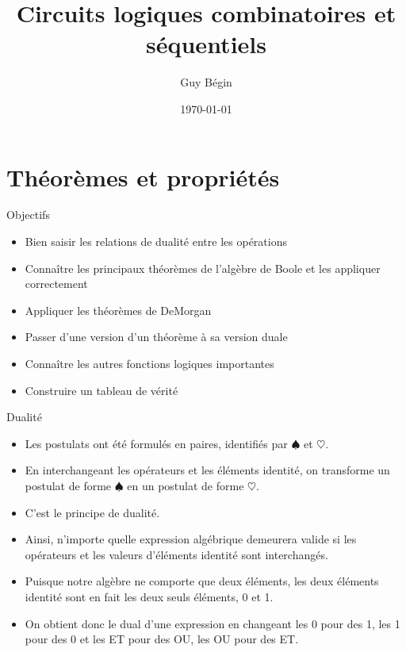 \documentclass[presentation]{beamer}
\author{Guy Bégin}
\date{\today}
\title{Circuits logiques combinatoires et séquentiels}
\begin{document}
\maketitle


\section{Théorèmes et propriétés}
\label{sec:orgb6a0084}
\begin{frame}[label={sec:org0343b0f}]{Objectifs}
\begin{itemize}
\item Bien saisir les relations de dualité entre les opérations
\item Connaître les principaux théorèmes de l'algèbre de Boole et 
les appliquer correctement
\item Appliquer les théorèmes de DeMorgan
\item Passer d'une version d'un théorème à sa version duale
\item Connaître les autres fonctions logiques importantes
\item Construire un tableau de vérité
\end{itemize}
\end{frame}

\begin{frame}[label={sec:orgc19c5fb}]{Dualité}
\begin{itemize}
\item Les postulats ont été formulés en paires, identifiés par \(\spadesuit\) et \(\heartsuit\).

\item En interchangeant les opérateurs et les éléments identité, on transforme un postulat de forme \(\spadesuit\) en un postulat de forme \(\heartsuit\).

\item C'est le principe de \alert{dualité}.

\item Ainsi, n'importe quelle expression algébrique demeurera valide si les opérateurs et les valeurs d'éléments identité sont interchangés.

\item Puisque notre algèbre ne comporte que deux éléments, les deux éléments identité sont en fait les deux seuls éléments, 0 et 1.

\item On obtient donc le dual d'une expression en changeant les 0 pour des 1, les 1 pour des 0 et les ET pour des OU, les OU pour des ET.
\end{itemize}
\end{frame}
\end{document}
